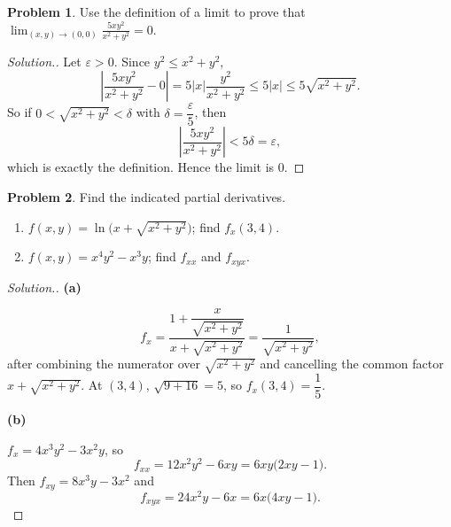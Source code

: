 \documentclass[11pt,a4paper]{article}
\theoremstyle{definition}
\newtheorem{problemx}{Problem}[subsection]
\newenvironment{problem}{\begin{problemx}}{\end{problemx}}
\newenvironment{solution}
  {\renewcommand{\qedsymbol}{}\begin{proof}[\textit{Solution}.]}
  {\end{proof}}
\newcommand{\subhead}[1]{%
  \par\medskip\noindent\textbf{#1}\par\nobreak\smallskip}
\begin{document}
\begin{problem}
Use the definition of a limit to prove that
$\displaystyle{\lim_{(x,y)\rightarrow(0,0)}\frac{5xy^2}{x^2+y^2} = 0}$.
\end{problem}
\begin{solution}
Let $\varepsilon>0$. Since $y^2\leq x^2+y^2$,
$$\left|\frac{5xy^2}{x^2+y^2} - 0\right|
= 5\left|x\right|\frac{y^2}{x^2+y^2}\leq 5\left|x\right|
\leq 5\sqrt{x^2+y^2} .$$
So if $0<\sqrt{x^2+y^2}<\delta$ with $\delta = \dfrac{\varepsilon}{5}$, then
$$\left|\frac{5xy^2}{x^2+y^2}\right| < 5\delta = \varepsilon ,$$
which is exactly the definition. Hence the limit is $0$.
\end{solution}

\begin{problem}
Find the indicated partial derivatives.
\begin{enumerate}
\item[(a)] $f(x,y) = \ln\big(x+\sqrt{x^2+y^2}\big)$; find $f_x(3,4)$.
\item[(b)] $f(x,y) = x^4y^2-x^3y$; find $f_{xx}$ and $f_{xyx}$.
\end{enumerate}
\end{problem}
\begin{solution}
\subhead{(a)}
$$f_x = \frac{1 + \dfrac{x}{\sqrt{x^2+y^2}}}{x+\sqrt{x^2+y^2}}
= \frac{1}{\sqrt{x^2+y^2}} ,$$
after combining the numerator over $\sqrt{x^2+y^2}$ and cancelling the common
factor $x+\sqrt{x^2+y^2}$. At $(3,4)$, $\sqrt{9+16} = 5$, so
$f_x(3,4) = \dfrac15$.

\subhead{(b)}
$f_x = 4x^3y^2 - 3x^2y$, so
$$f_{xx} = 12x^2y^2 - 6xy = 6xy\big(2xy-1\big).$$
Then $f_{xy} = 8x^3y - 3x^2$ and
$$f_{xyx} = 24x^2y - 6x = 6x\big(4xy-1\big).$$
\end{solution}
\end{document}
